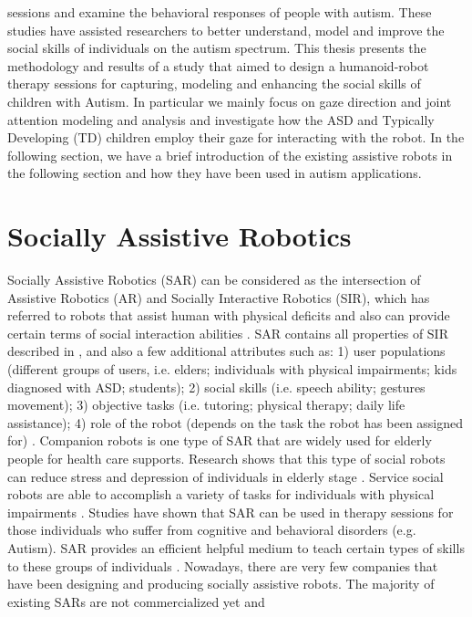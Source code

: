 sessions and examine the behavioral responses of people with autism. These studies have
assisted researchers to better understand, model and improve the social skills of individuals
on the autism spectrum.
This thesis presents the methodology and results of a study that aimed to design a
humanoid-robot therapy sessions for capturing, modeling and enhancing the social skills
of children with Autism. In particular we mainly focus on gaze direction and joint attention
modeling and analysis and investigate how the ASD and Typically Developing (TD)
children employ their gaze for interacting with the robot. In the following section, we have
a brief introduction of the existing assistive robots in the following section and how they
have been used in autism applications.

\section{Socially Assistive Robotics}
Socially Assistive Robotics (SAR) can be considered as the intersection of Assistive
Robotics (AR) and Socially Interactive Robotics (SIR), which has referred to robots that
assist human with physical deficits and also can provide certain terms of social interaction
abilities \cite{DefineSocial2005}. SAR contains all properties of SIR described in \cite{SocialInteract2003}, and also a few additional
attributes such as: 1) user populations (different groups of users, i.e. elders; individuals
with physical impairments; kids diagnosed with ASD; students); 2) social skills (i.e. speech
ability; gestures movement); 3) objective tasks (i.e. tutoring; physical therapy; daily life
assistance); 4) role of the robot (depends on the task the robot has been assigned for) \cite{DefineSocial2005}.
Companion robots \cite{AnalysisFactor2002} is one type of SAR that are widely used for elderly people
for health care supports. Research shows that this type of social robots can reduce stress
and depression of individuals in elderly stage \cite{AnimalAssist2002}. Service social robots are able to
accomplish a variety of tasks for individuals with physical impairments \cite{Fetch2002}. Studies have
shown that SAR can be used in therapy sessions for those individuals who suffer from
cognitive and behavioral disorders (e.g. Autism). SAR provides an efficient helpful
medium to teach certain types of skills to these groups of individuals \cite{RobotPlaymate2002, RollingRobot2002, MobileRobotic2002}.
Nowadays, there are very few companies that have been designing and producing
socially assistive robots. The majority of existing SARs are not commercialized yet and
